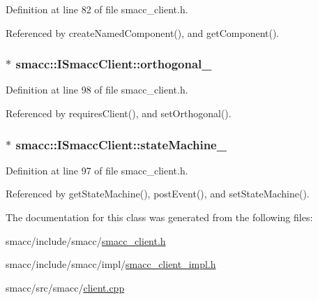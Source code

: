 Definition at line 82 of file smacc\+\_\+client.\+h.



Referenced by create\+Named\+Component(), and get\+Component().

\subsubsection[{\texorpdfstring{orthogonal\+\_\+}{orthogonal_}}]{$\ast$ smacc\+::\+I\+Smacc\+Client\+::orthogonal\+\_\+\hspace{0.3cm}{\ttfamily [private]}}\hypertarget{classsmacc_1_1ISmaccClient_a571c7f672d9c90128b5498aefc27c136}{}\label{classsmacc_1_1ISmaccClient_a571c7f672d9c90128b5498aefc27c136}


Definition at line 98 of file smacc\+\_\+client.\+h.



Referenced by requires\+Client(), and set\+Orthogonal().

\subsubsection[{\texorpdfstring{state\+Machine\+\_\+}{stateMachine_}}]{$\ast$ smacc\+::\+I\+Smacc\+Client\+::state\+Machine\+\_\+\hspace{0.3cm}{\ttfamily [private]}}\hypertarget{classsmacc_1_1ISmaccClient_a926e4f2ae796def63d48dca389a48c47}{}\label{classsmacc_1_1ISmaccClient_a926e4f2ae796def63d48dca389a48c47}


Definition at line 97 of file smacc\+\_\+client.\+h.



Referenced by get\+State\+Machine(), post\+Event(), and set\+State\+Machine().



The documentation for this class was generated from the following files\+:\begin{DoxyCompactItemize}
\item 
smacc/include/smacc/\hyperlink{smacc__client_8h}{smacc\+\_\+client.\+h}\item 
smacc/include/smacc/impl/\hyperlink{smacc__client__impl_8h}{smacc\+\_\+client\+\_\+impl.\+h}\item 
smacc/src/smacc/\hyperlink{client_8cpp}{client.\+cpp}\end{DoxyCompactItemize}
